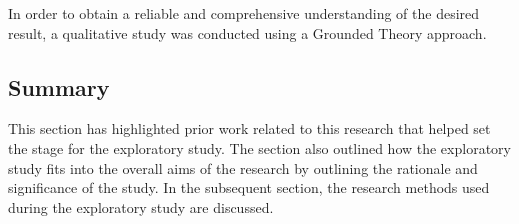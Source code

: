 In order to obtain a reliable and comprehensive understanding of the desired
result, a qualitative study was conducted using a Grounded Theory approach.

\subsection{Summary}
\label{sec:exploratory-study:research-perspective:summary}

This section has highlighted prior work related to this research that
helped set the stage for the exploratory study. The section also outlined how
the exploratory study fits into the overall aims of the research by outlining
the rationale and significance of the study. In the subsequent section, the
research methods used during the exploratory study are discussed.